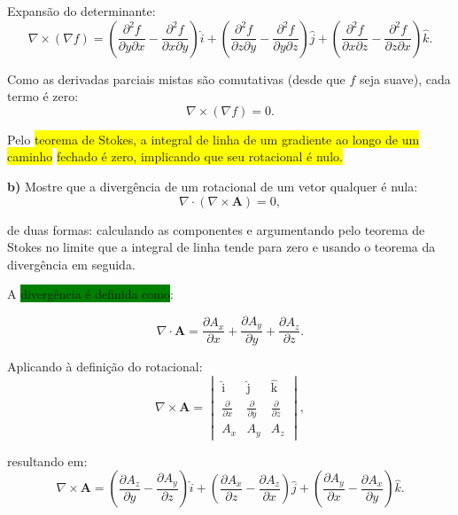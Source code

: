 \documentclass[a4paper,12pt]{article}
\begin{document}
Expansão do determinante:
\begin{equation}
    \nabla \times (\nabla f) = 
    \left( \frac{\partial^2 f}{\partial y \partial x} - \frac{\partial^2 f}{\partial x \partial y} \right) \hat{i} + 
    \left( \frac{\partial^2 f}{\partial z \partial y} - \frac{\partial^2 f}{\partial y \partial z} \right) \hat{j} + 
    \left( \frac{\partial^2 f}{\partial x \partial z} - \frac{\partial^2 f}{\partial z \partial x} \right) \hat{k}.
\end{equation}

Como as derivadas parciais mistas são comutativas (desde que $f$ seja suave), cada termo é zero:
\begin{equation}
\boxed{\nabla \times (\nabla f) = 0.}
\end{equation}

Pelo \colorbox{yellow}{teorema de Stokes, a integral de linha de um gradiente ao longo de um caminho} 
\colorbox{yellow}{fechado é zero, implicando que seu rotacional é nulo.}

\textbf{b)} Mostre que a divergência de um rotacional de um vetor qualquer é nula:
\begin{equation}
\boxed{\nabla \cdot (\nabla \times \mathbf{A}) = 0,}
\end{equation}

de duas formas: calculando as componentes e argumentando pelo teorema de Stokes no limite que a integral de linha tende para zero e usando o teorema da divergência em seguida.

A \colorbox{green}{divergência é definida como}:

\begin{equation}
 \boxed{\nabla \cdot \mathbf{A} = \frac{\partial A_x}{\partial x} + \frac{\partial A_y}{\partial y} + \frac{\partial A_z}{\partial z}.}
\end{equation}

Aplicando à definição do rotacional:
\begin{equation}
    \nabla \times \mathbf{A} = 
    \begin{vmatrix} 
        \hat{\textrm{i}} & \hat{\textrm{j}} & \hat{\textrm{k}} \\
        \frac{\partial}{\partial x} & \frac{\partial}{\partial y} & \frac{\partial}{\partial z} \\
        A_x & A_y & A_z
    \end{vmatrix},
\end{equation}

resultando em:
\begin{equation}
    \nabla \times \mathbf{A} = 
    \left( \frac{\partial A_z}{\partial y} - \frac{\partial A_y}{\partial z} \right) \hat{i} + 
    \left( \frac{\partial A_x}{\partial z} - \frac{\partial A_z}{\partial x} \right) \hat{j} + 
    \left( \frac{\partial A_y}{\partial x} - \frac{\partial A_x}{\partial y} \right) \hat{k}.
\end{equation}
\end{document}
